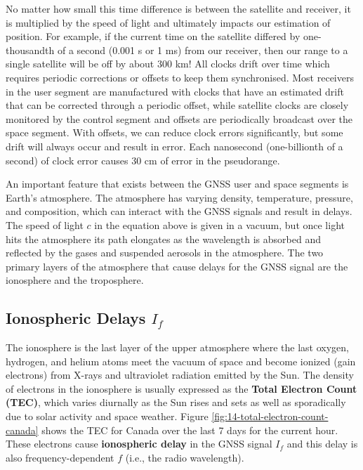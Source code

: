 \documentclass[
]{book}
\begin{document}
No matter how small this time difference is between the satellite and receiver, it is multiplied by the speed of light and ultimately impacts our estimation of position. For example, if the current time on the satellite differed by one-thousandth of a second (0.001 s or 1 ms) from our receiver, then our range to a single satellite will be off by about 300 km! All clocks drift over time which requires periodic corrections or offsets to keep them synchronised. Most receivers in the user segment are manufactured with clocks that have an estimated drift that can be corrected through a periodic offset, while satellite clocks are closely monitored by the control segment and offsets are periodically broadcast over the space segment. With offsets, we can reduce clock errors significantly, but some drift will always occur and result in error. Each nanosecond (one-billionth of a second) of clock error causes 30 cm of error in the pseudorange.

An important feature that exists between the GNSS user and space segments is Earth's atmosphere. The atmosphere has varying density, temperature, pressure, and composition, which can interact with the GNSS signals and result in delays. The speed of light \(c\) in the equation above is given in a vacuum, but once light hits the atmosphere its path elongates as the wavelength is absorbed and reflected by the gases and suspended aerosols in the atmosphere. The two primary layers of the atmosphere that cause delays for the GNSS signal are the ionosphere and the troposphere.

\hypertarget{ionospheric-delays-i_f}{%
\subsection{\texorpdfstring{Ionospheric Delays \(I_f\)}{Ionospheric Delays I\_f}}\label{ionospheric-delays-i_f}}

The ionosphere is the last layer of the upper atmosphere where the last oxygen, hydrogen, and helium atoms meet the vacuum of space and become ionized (gain electrons) from X-rays and ultraviolet radiation emitted by the Sun. The density of electrons in the ionosphere is usually expressed as the \textbf{Total Electron Count (TEC)}, which varies diurnally as the Sun rises and sets as well as sporadically due to solar activity and space weather. Figure \ref{fig:14-total-electron-count-canada} shows the TEC for Canada over the last 7 days for the current hour. These electrons cause \textbf{ionospheric delay} in the GNSS signal \(I_f\) and this delay is also frequency-dependent \(f\) (i.e., the radio wavelength).
\end{document}
